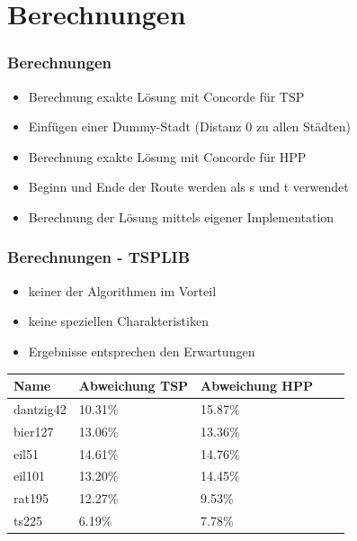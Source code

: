 \documentclass[12pt]{beamer}
\begin{document}
    \section{Berechnungen}
    \begin{frame}
        \frametitle{Berechnungen}
            \begin{itemize}
                \item Berechnung exakte Lösung mit Concorde für TSP
                \item Einfügen einer Dummy-Stadt (Distanz 0 zu allen Städten)
                \item Berechnung exakte Lösung mit Concorde für HPP
                \item Beginn und Ende der Route werden als s und t verwendet
                \item Berechnung der Lösung mittels eigener Implementation
            \end{itemize}
    \end{frame}
    \begin{frame}
        \frametitle{Berechnungen - TSPLIB}
	    \begin{itemize}
                \item keiner der Algorithmen im Vorteil
                \item keine speziellen Charakteristiken
                \item Ergebnisse entsprechen den Erwartungen
            \end{itemize}

    \begin{table}[H]
                \centering
                \begin{tabular}{| p{2.0cm} | p{2.0cm} | p{2.5cm} | p{2.5cm} | p{2.5cm} |}
                    \hline
                    \small{\textbf{Name}} &
                    \small{\textbf{Abweichung TSP}} & 
                    \small{\textbf{Abweichung HPP}} \\ \hline

                    dantzig42   & 10.31\%   & 15.87\%   \\ \hline
                    bier127     & 13.06\%   & 13.36\%   \\ \hline
                    eil51       & 14.61\%   & 14.76\%   \\ \hline
                    eil101      & 13.20\%   & 14.45\%   \\ \hline
                    rat195      & 12.27\%   & 9.53\%    \\ \hline
                    ts225       &  6.19\%   & 7.78\%    \\ \hline
               \end{tabular}
        \end{table}
    \end{frame}
\end{document}
